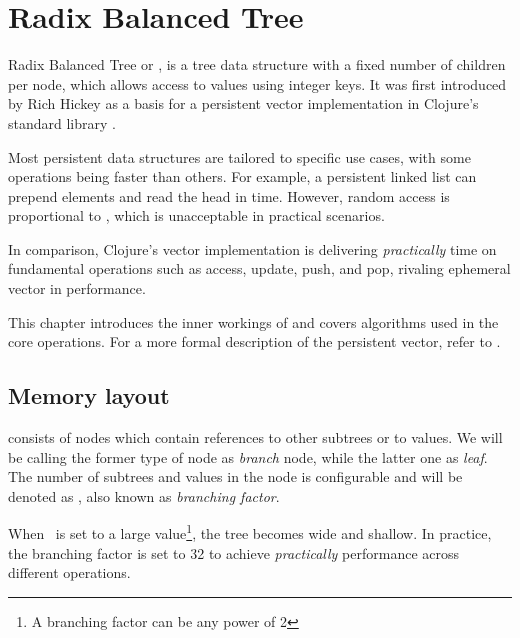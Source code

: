 

\chapter{Radix Balanced Tree}

Radix Balanced Tree or \rbtree, is a tree data structure with a fixed number of children per node, which allows access to values using integer keys. It was first introduced by Rich Hickey as a basis for a persistent vector implementation in Clojure's standard library \cite{the-clojure-programming-language}. 

Most persistent data structures are tailored to specific use cases, with some operations being faster than others. For example, a persistent linked list can prepend elements and read the head in  time. However, random access is proportional to , which is unacceptable in practical scenarios. 

In comparison, Clojure's vector implementation is delivering \emph{practically}  time on fundamental operations such as access, update, push, and pop, rivaling ephemeral vector in performance.

This chapter introduces the inner workings of \rbtree{} and covers algorithms used in the core operations. For a more formal description of the persistent vector, refer to \cite{improving-performance-through-transience}. 

\section{Memory layout}
\label{sec:rb-tree-memory-layout}

\rbtree{} consists of nodes which contain references to other subtrees or to values. We will be calling the former type of node as \emph{branch} node, while the latter one as \emph{leaf}. The number of subtrees and values in the node is configurable and will be denoted as \m, also known as \emph{branching factor}. 

When \m\ is set to a large value\footnote{A branching factor can be any power of 2}, the tree becomes wide and shallow. In practice, the branching factor is set to 32 to achieve \emph{practically}  performance across different operations.


